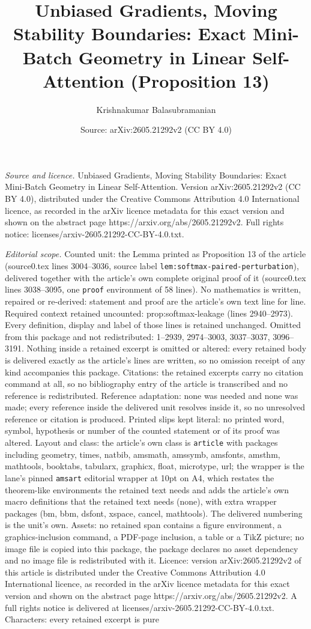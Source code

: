 \documentclass[10pt,a4paper]{amsart}
\title[Unbiased Gradients, Moving Stability Boundaries: Exact Mini-]{Unbiased Gradients, Moving Stability Boundaries: Exact Mini-Batch Geometry in Linear Self-Attention (Proposition 13)}
\author{Krishnakumar Balasubramanian}
\date{Source: arXiv:2605.21292v2 (CC BY 4.0)}
\begin{document}
\maketitle

\noindent\emph{Source and licence.} Unbiased Gradients, Moving Stability Boundaries: Exact Mini-Batch Geometry in Linear Self-Attention. Version arXiv:2605.21292v2 (CC BY 4.0), distributed under the Creative Commons Attribution 4.0 International licence, as recorded in the arXiv licence metadata for this exact version and shown on the abstract page https://arxiv.org/abs/2605.21292v2. Full rights notice: licenses/arxiv-2605.21292-CC-BY-4.0.txt.\par\smallskip

\noindent\textit{Editorial scope.} Counted unit: the Lemma printed as Proposition 13 of the article (source0.tex lines 3004--3036, source label \texttt{lem:softmax-paired-perturbation}), delivered together with the article's own complete original proof of it (source0.tex lines 3038--3095, one \texttt{proof} environment of 58 lines). No mathematics is written, repaired or re-derived: statement and proof are the article's own text line for line. Required context retained uncounted: prop:softmax-leakage (lines 2940--2973). Every definition, display and label of those lines is retained unchanged. Omitted from this package and not redistributed: 1--2939, 2974--3003, 3037--3037, 3096--3191. Nothing inside a retained excerpt is omitted or altered: every retained body is delivered exactly as the article's lines are written, so no omission receipt of any kind accompanies this package. Citations: the retained excerpts carry no citation command at all, so no bibliography entry of the article is transcribed and no reference is redistributed. Reference adaptation: none was needed and none was made; every reference inside the delivered unit resolves inside it, so no unresolved reference or citation is produced. Printed slips kept literal: no printed word, symbol, hypothesis or number of the counted statement or of its proof was altered. Layout and class: the article's own class is \texttt{article} with packages including geometry, times, natbib, amsmath, amssymb, amsfonts, amsthm, mathtools, booktabs, tabularx, graphicx, float, microtype, url; the wrapper is the lane's pinned \texttt{amsart} editorial wrapper at 10pt on A4, which restates the theorem-like environments the retained text needs and adds the article's own macro definitions that the retained text needs (none), with extra wrapper packages (bm, bbm, dsfont, xspace, cancel, mathtools). The delivered numbering is the unit's own. Assets: no retained span contains a figure environment, a graphics-inclusion command, a PDF-page inclusion, a table or a TikZ picture; no image file is copied into this package, the package declares no asset dependency and no image file is redistributed with it. Licence: version arXiv:2605.21292v2 of this article is distributed under the Creative Commons Attribution 4.0 International licence, as recorded in the arXiv licence metadata for this exact version and shown on the abstract page https://arxiv.org/abs/2605.21292v2. A full rights notice is delivered at licenses/arxiv-2605.21292-CC-BY-4.0.txt. Characters: every retained excerpt is pure 
\end{document}
